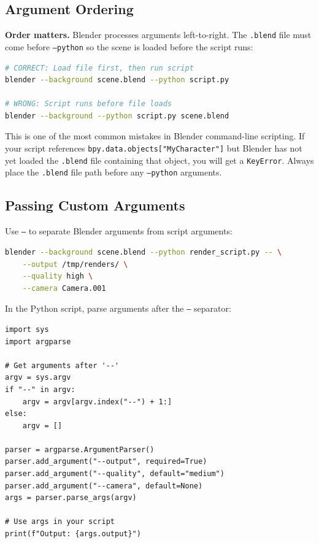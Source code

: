 \subsection{Argument Ordering}

\textbf{Order matters.} Blender processes arguments left-to-right. The \texttt{.blend} file must come before \texttt{--python} so the scene is loaded before the script runs:

\begin{lstlisting}[language=bash]
# CORRECT: Load file first, then run script
blender --background scene.blend --python script.py

# WRONG: Script runs before file loads
blender --background --python script.py scene.blend
\end{lstlisting}

\begin{warningbox}
This is one of the most common mistakes in Blender command-line scripting. If your script references \texttt{bpy.data.objects["MyCharacter"]} but Blender has not yet loaded the \texttt{.blend} file containing that object, you will get a \texttt{KeyError}. Always place the \texttt{.blend} file path before any \texttt{--python} arguments.
\end{warningbox}

\subsection{Passing Custom Arguments}

Use \texttt{--} to separate Blender arguments from script arguments:

\begin{lstlisting}[language=bash]
blender --background scene.blend --python render_script.py -- \
    --output /tmp/renders/ \
    --quality high \
    --camera Camera.001
\end{lstlisting}

In the Python script, parse arguments after the \texttt{--} separator:

\begin{lstlisting}
import sys
import argparse

# Get arguments after '--'
argv = sys.argv
if "--" in argv:
    argv = argv[argv.index("--") + 1:]
else:
    argv = []

parser = argparse.ArgumentParser()
parser.add_argument("--output", required=True)
parser.add_argument("--quality", default="medium")
parser.add_argument("--camera", default=None)
args = parser.parse_args(argv)

# Use args in your script
print(f"Output: {args.output}")
\end{lstlisting}

